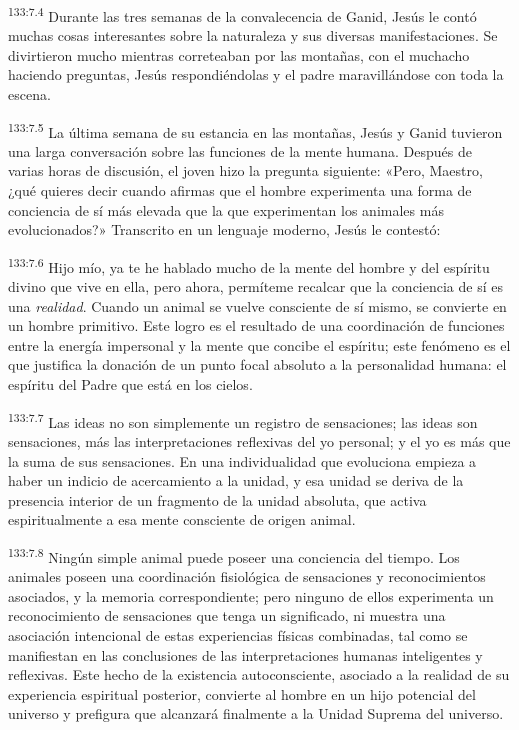 \par
\textsuperscript{133:7.4} Durante las tres semanas de la convalecencia de Ganid, Jesús le contó muchas cosas interesantes sobre la naturaleza y sus diversas manifestaciones. Se divirtieron mucho mientras correteaban por las montañas, con el muchacho haciendo preguntas, Jesús respondiéndolas y el padre maravillándose con toda la escena.

\par
\textsuperscript{133:7.5} La última semana de su estancia en las montañas, Jesús y Ganid tuvieron una larga conversación sobre las funciones de la mente humana. Después de varias horas de discusión, el joven hizo la pregunta siguiente: «Pero, Maestro, ¿qué quieres decir cuando afirmas que el hombre experimenta una forma de conciencia de sí más elevada que la que experimentan los animales más evolucionados?» Transcrito en un lenguaje moderno, Jesús le contestó:

\par
\textsuperscript{133:7.6} Hijo mío, ya te he hablado mucho de la mente del hombre y del espíritu divino que vive en ella, pero ahora, permíteme recalcar que la conciencia de sí es una \textit{realidad}. Cuando un animal se vuelve consciente de sí mismo, se convierte en un hombre primitivo. Este logro es el resultado de una coordinación de funciones entre la energía impersonal y la mente que concibe el espíritu; este fenómeno es el que justifica la donación de un punto focal absoluto a la personalidad humana: el espíritu del Padre que está en los cielos.

\par
\textsuperscript{133:7.7} Las ideas no son simplemente un registro de sensaciones; las ideas son sensaciones, más las interpretaciones reflexivas del yo personal; y el yo es más que la suma de sus sensaciones. En una individualidad que evoluciona empieza a haber un indicio de acercamiento a la unidad, y esa unidad se deriva de la presencia interior de un fragmento de la unidad absoluta, que activa espiritualmente a esa mente consciente de origen animal.

\par
\textsuperscript{133:7.8} Ningún simple animal puede poseer una conciencia del tiempo. Los animales poseen una coordinación fisiológica de sensaciones y reconocimientos asociados, y la memoria correspondiente; pero ninguno de ellos experimenta un reconocimiento de sensaciones que tenga un significado, ni muestra una asociación intencional de estas experiencias físicas combinadas, tal como se manifiestan en las conclusiones de las interpretaciones humanas inteligentes y reflexivas. Este hecho de la existencia autoconsciente, asociado a la realidad de su experiencia espiritual posterior, convierte al hombre en un hijo potencial del universo y prefigura que alcanzará finalmente a la Unidad Suprema del universo.

